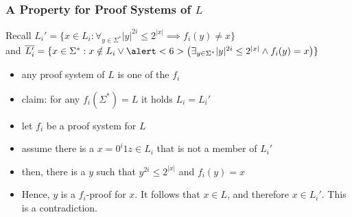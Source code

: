 \begin{frame}
  \frametitle{A Property for Proof Systems of \(L\)}

  Recall \(L_i' = \{ x \in L_i : \forall_{y \in \Sigma^*} |y|^{2i} \leq 2^{|x|} \implies f_i(y) \neq x \}\) \\
  and \(\overline{L_i'} = \{ x \in \Sigma^* : x \notin L_i \vee \alert<6>{\left( \exists_{y \in \Sigma^*} |y|^{2i} \leq 2^{|x|} \wedge f_i(y) = x \right)}  \}\)
  
  \begin{itemize}
   \item<2-> any proof system of \(L\) is one of the \(f_i\)
   \item<3-> claim: for any \(f_i(\Sigma^*) = L\) it holds \(L_i = L_i'\)
  \end{itemize}

  \begin{itemize}
    \item<4-> let \(f_i\) be a proof system for \(L\)
    \item<5-> assume there is a \(x = 0^i1z \in L_i\) that \alert<8>{is not a member of \(L_i'\)}
    \item<6-> \alert<6>{then, there is a \(y\) such that \(y^{2i} \leq 2^{|x|}\) and \(f_i(y) = x\)}
    \item<7-> Hence, \(y\) is a \(f_i\)-proof for \(x\). It follows that \(x \in L\), and therefore \alert<8>{\(x \in L_i'\)}.  This is a contradiction.
  \end{itemize}
\end{frame}

